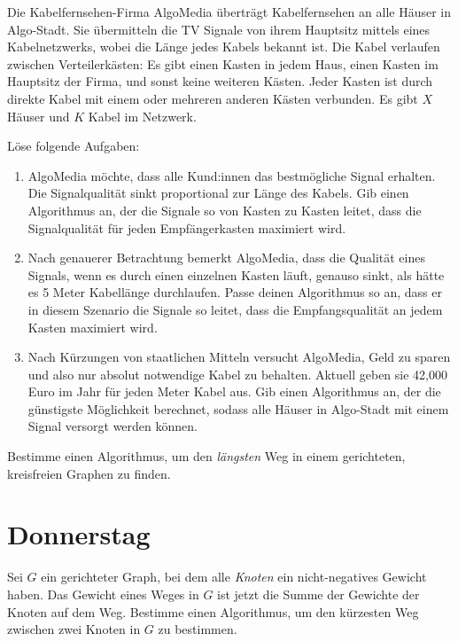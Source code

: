 \documentclass{uebung_cs}
\begin{document}
\begin{aufgabe}
	Die Kabelfernsehen-Firma AlgoMedia überträgt Kabelfernsehen an alle Häuser in Algo-Stadt.
	Sie übermitteln die TV Signale von ihrem Hauptsitz mittels eines Kabelnetzwerks, wobei die Länge jedes Kabels bekannt ist.
	Die Kabel verlaufen zwischen Verteilerkästen:
	Es gibt einen Kasten in jedem Haus, einen Kasten im Hauptsitz der Firma, und sonst keine weiteren Kästen.
	Jeder Kasten ist durch direkte Kabel mit einem oder mehreren anderen Kästen verbunden. Es gibt $X$ Häuser und $K$ Kabel im Netzwerk.

	Löse folgende Aufgaben:
	\begin{enumerate}
		\item AlgoMedia möchte, dass alle Kund:innen das bestmögliche Signal erhalten.
		Die Signalqualität sinkt proportional zur Länge des Kabels.
		Gib einen Algorithmus an, der die Signale so von Kasten zu Kasten leitet, dass die Signalqualität für jeden Empfängerkasten maximiert wird.
		\item Nach genauerer Betrachtung bemerkt AlgoMedia, dass die Qualität eines Signals, wenn es durch einen einzelnen Kasten läuft, genauso sinkt, als hätte es 5 Meter Kabellänge durchlaufen.
		Passe deinen Algorithmus so an, dass er in diesem Szenario die Signale so leitet, dass die Empfangsqualität an jedem Kasten maximiert wird.
		\item Nach Kürzungen von staatlichen Mitteln versucht AlgoMedia, Geld zu sparen und also nur absolut notwendige Kabel zu behalten.
		Aktuell geben sie 42,000 Euro im Jahr für jeden Meter Kabel aus.
		Gib einen Algorithmus an, der die günstigste Möglichkeit berechnet, sodass alle Häuser in Algo-Stadt mit einem Signal versorgt werden können.
	\end{enumerate}
\end{aufgabe}


\begin{aufgabe}
	Bestimme einen Algorithmus, um den \emph{längsten} Weg in einem gerichteten, kreisfreien Graphen zu finden.
\end{aufgabe}

\newpage\section*{Donnerstag}
\begin{aufgabe}
	Sei $G$ ein gerichteter Graph, bei dem alle \emph{Knoten} ein nicht-negatives Gewicht haben.
	Das Gewicht eines Weges in $G$ ist jetzt die Summe der Gewichte der Knoten auf dem Weg.
	Bestimme einen Algorithmus, um den kürzesten Weg zwischen zwei Knoten in $G$ zu bestimmen.
\end{aufgabe}
\end{document}
